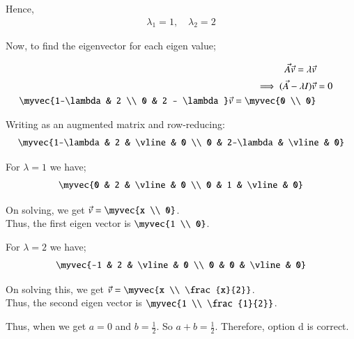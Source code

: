 \documentclass[journal]{IEEEtran}
\begin{document}
Hence,
\begin{align}
\lambda_1 = 1, \quad \lambda_2 = 2
\end{align}

Now, to find the eigenvector for each eigen value;

\begin{align}
\Vec{A}\Vec{v} = \lambda\Vec{v} \\
\implies (\Vec{A} - \lambda I)\vec{v} &= 0 \\
\myvec{1-\lambda & 2 \\ 0 & 2 - \lambda}\Vec{v} = \myvec{0 \\ 0}
\end{align}

Writing as an augmented matrix and row-reducing:
\begin{align}
\myvec{1-\lambda & 2 & \vline & 0 \\ 0 & 2-\lambda & \vline & 0}
\end{align}

For $\lambda=1$ we have;
\begin{align}
\myvec{0 & 2 & \vline & 0 \\ 0 & 1 & \vline & 0}
\end{align}

On solving, we get $\Vec{v}=\myvec{x \\ 0}$. \\
Thus, the first eigen vector is $\myvec{1 \\ 0}$.

For $\lambda=2$ we have;
\begin{align}
\myvec{-1 & 2 & \vline & 0 \\ 0 & 0 & \vline & 0}
\end{align}

On solving this, we get $\Vec{v}=\myvec{x \\ \frac{x}{2}}$. \\
Thus, the second eigen vector is $\myvec{1 \\ \frac{1}{2}}$.

Thus, when we get $a=0$ and $b=\frac{1}{2}$. So $a+b=\frac{1}{2}$.
Therefore, option d is correct.
\end{document}
